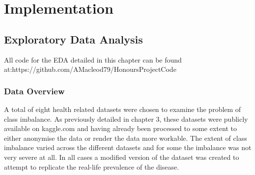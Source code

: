 \chapter{Implementation}\label{ch:Implementation}

\section{Exploratory Data Analysis}
All code for the EDA detailed in this chapter can be found at:\newline https://github.com/AMacleod79/HonoursProjectCode
\subsection{Data Overview}
A total of eight health related datasets were chosen to examine the problem of class imbalance. As previously detailed in chapter 3, these datasets were publicly available on kaggle.com and having already been processed to some extent to either anonymise the data or render the data more workable. The extent of class imbalance varied across the different datasets and for some the imbalance was not very severe at all. In all cases a modified version of the dataset was created to attempt to replicate the real-life prevalence of the disease.\newline

